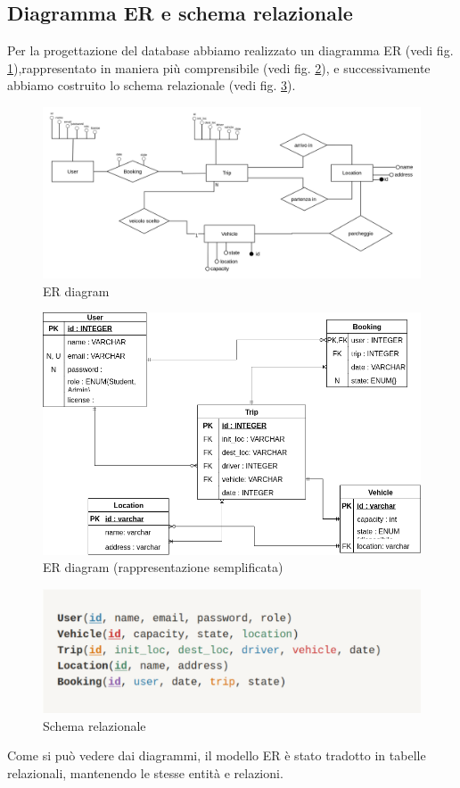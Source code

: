 \subsection{Diagramma ER e schema relazionale}\label{subsec:DB}
Per la progettazione del database abbiamo realizzato un diagramma ER (vedi fig. \ref{fig:ERdiag}),rappresentato in maniera più comprensibile (vedi fig. \ref{fig:ERraw}), e successivamente abbiamo costruito lo schema relazionale (vedi fig. \ref{fig:ERscheme}).
\begin{figure}[H]
    \centering
    \includegraphics[width=1.1\linewidth]{Images/ER_diagram.png}
    \caption{ER diagram}
    \label{fig:ERdiag}
\end{figure}
\begin{figure}[H]
    \centering
    \includegraphics[width=1.2\linewidth]{Images/ERraw.png}
    \caption{ER diagram (rappresentazione semplificata)}
    \label{fig:ERraw}
\end{figure}
\begin{figure}[H]
    \centering
    \includegraphics[width=0.8\linewidth]{Images/schema_relazionale.png}
    \caption{Schema relazionale}
    \label{fig:ERscheme}
\end{figure}
Come si può  vedere dai diagrammi, il modello ER è stato tradotto in tabelle relazionali, mantenendo le stesse entità e relazioni.